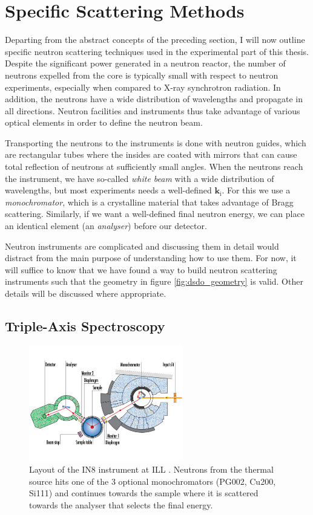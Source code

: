\section{Specific Scattering Methods}\label{sec:specific_neutron}
Departing from the abstract concepts of the preceding section, I will now outline specific neutron scattering techniques used in the experimental part of this thesis. Despite the significant power generated in a neutron reactor, the number of neutrons expelled from the core is typically small with respect to neutron experiments, especially when compared to X-ray synchrotron radiation. In addition, the neutrons have a wide distribution of wavelengths and propagate in all directions. Neutron facilities and instruments thus take advantage of various optical elements in order to define the neutron beam.

Transporting the neutrons to the instruments is done with neutron guides, which are rectangular tubes where the insides are coated with mirrors that can cause total reflection of neutrons at sufficiently small angles. When the neutrons reach the instrument, we have so-called \emph{white beam} with a wide distribution of wavelengths, but most experiments needs a well-defined $\bm{k}_\text{i}$. For this we use a \emph{monochromator}, which is a crystalline material that takes advantage of Bragg scattering. Similarly, if we want a well-defined final neutron energy, we can place an identical element (an \emph{analyser}) before our detector.

Neutron instruments are complicated and discussing them in detail would distract from the main purpose of understanding how to use them. For now, it will suffice to know that we have found a way to build neutron scattering instruments such that the geometry in figure \ref{fig:dsdo_geometry} is valid. Other details will be discussed where appropriate.

\subsection{Triple-Axis Spectroscopy}

\begin{figure}
	\centering
	\includegraphics[width=0.6\textwidth]{fig/method/ns/in8.jpg}
	\caption[in8 layout]{Layout of the IN8 instrument at ILL \cite{in8}. Neutrons from the thermal source hits one of the 3 optional monochromators (PG002, Cu200, Si111) and continues towards the sample where it is scattered towards the analyser that selects the final energy.}
	\label{fig:in8}
\end{figure}

